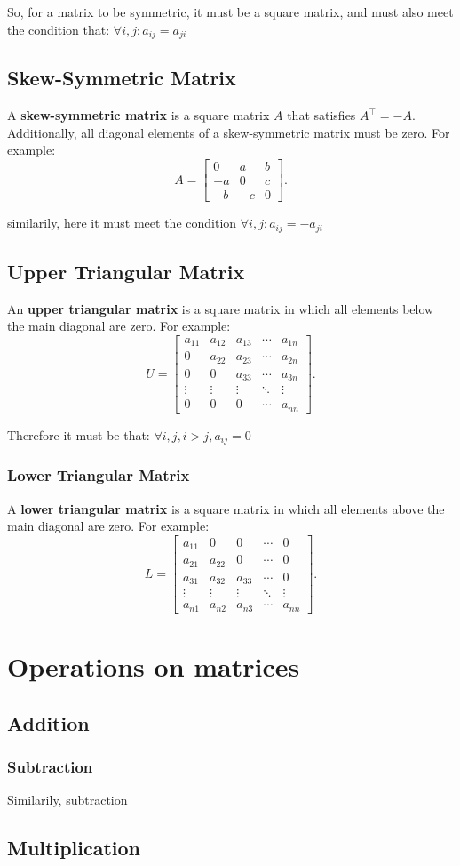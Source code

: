 \documentclass{article}
\begin{document}
So, for a matrix to be symmetric, it must be a square matrix, and must also meet the condition that:
$\forall i,j: a_{ij} =a_{ji}$

\subsection{Skew-Symmetric Matrix}
A \textbf{skew-symmetric matrix} is a square matrix $A$ that satisfies $A^\top = -A$. Additionally, all diagonal elements of a skew-symmetric matrix must be zero. For example:
\[
A =
\begin{bmatrix}
0 & a & b \\
-a & 0 & c \\
-b & -c & 0
\end{bmatrix}.
\]

similarily, here it must meet the condition
$\forall i,j: a_{ij} =-a_{ji}$

\subsection{Upper Triangular Matrix}
An \textbf{upper triangular matrix} is a square matrix in which all elements below the main diagonal are zero. For example:
\[
U =
\begin{bmatrix}
a_{11} & a_{12} & a_{13} & \cdots & a_{1n} \\
0 & a_{22} & a_{23} & \cdots & a_{2n} \\
0 & 0 & a_{33} & \cdots & a_{3n} \\
\vdots & \vdots & \vdots & \ddots & \vdots \\
0 & 0 & 0 & \cdots & a_{nn}
\end{bmatrix}.
\]

Therefore it must be that:
$\forall i,j, i>j, a_{ij} = 0$

\subsubsection{Lower Triangular Matrix}
A \textbf{lower triangular matrix} is a square matrix in which all elements above the main diagonal are zero. For example:
\[
L =
\begin{bmatrix}
a_{11} & 0 & 0 & \cdots & 0 \\
a_{21} & a_{22} & 0 & \cdots & 0 \\
a_{31} & a_{32} & a_{33} & \cdots & 0 \\
\vdots & \vdots & \vdots & \ddots & \vdots \\
a_{n1} & a_{n2} & a_{n3} & \cdots & a_{nn}
\end{bmatrix}.
\]
\section{Operations on matrices}

\subsection{Addition}

\subsubsection{Subtraction}

Similarily, subtraction

\subsection{Multiplication}
\end{document}
